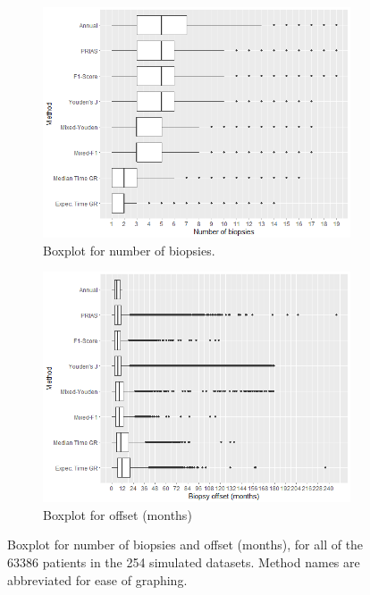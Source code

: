\begin{figure}[!htb]
    \centering
    \captionsetup{justification=centering}
     \begin{subfigure}[b]{0.45\textwidth}
        \includegraphics[width=\textwidth]{images/sim_study/nbBoxPlot_all.png}
        \caption{Boxplot for number of biopsies.}
        \label{fig : nbBoxPlot}
    \end{subfigure}
    \begin{subfigure}[b]{0.45\textwidth}
        \includegraphics[width=\textwidth]{images/sim_study/offsetBoxPlot_all.png}
        \caption{Boxplot for offset (months)}
        \label{fig : offsetBoxPlot}
    \end{subfigure}      
    \caption{Boxplot for number of biopsies and offset (months), for all of the 63386 patients in the 254 simulated datasets. Method names are abbreviated for ease of graphing.}
\end{figure}
